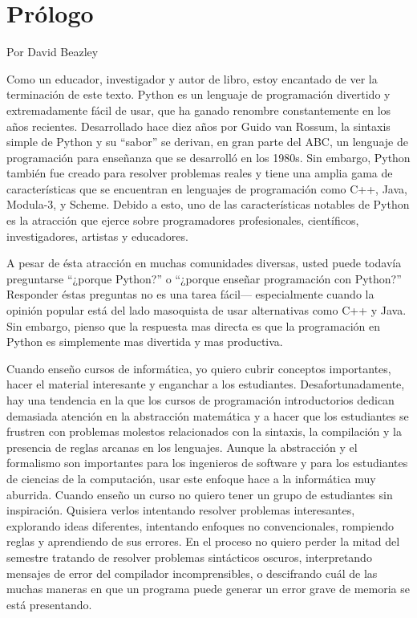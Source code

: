 
\chapter{Prólogo}

Por David Beazley

Como un educador, investigador y autor de libro, estoy encantado de ver
la terminación de este texto.  Python es un lenguaje de programación divertido y 
extremadamente fácil de usar, que ha ganado renombre constantemente en los años recientes.  
Desarrollado hace diez años por Guido
van Rossum, la sintaxis simple de Python y su ``sabor'' se derivan, en
gran parte del ABC, un lenguaje de programación para  enseñanza que se 
desarrolló en los 1980s.  Sin embargo, Python también fue creado para resolver problemas 
reales y tiene una amplia gama de características que se encuentran en lenguajes de
programación como C++, Java, Modula-3, y Scheme.  Debido a esto, uno de
las características notables de Python es  la  atracción que ejerce 
sobre programadores profesionales, científicos, investigadores, 
artistas y educadores.

A pesar de ésta atracción en  muchas  comunidades diversas, usted puede todavía preguntarse ``¿porque Python?'' o ``¿porque enseñar programación con Python?'' Responder 
éstas preguntas no es una tarea fácil---
especialmente cuando la opinión popular está del lado masoquista
de usar alternativas como C++ y Java.  Sin embargo, pienso que la respuesta mas directa es
que la programación en Python es simplemente mas divertida y mas productiva.

Cuando enseño cursos de informática, yo quiero cubrir conceptos
importantes, hacer el material interesante y enganchar a los estudiantes.
Desafortunadamente, hay una tendencia en la  que los cursos de programación
introductorios dedican demasiada atención en la abstracción
matemática y a hacer que los estudiantes se frustren con problemas
molestos relacionados con la sintaxis, la compilación  y la presencia
de reglas arcanas en los lenguajes. Aunque la abstracción y el formalismo
son importantes para los ingenieros de software y para los estudiantes de
ciencias de la computación, usar este enfoque hace a la informática muy aburrida.
Cuando enseño un curso no quiero tener un grupo de estudiantes sin inspiración.
Quisiera verlos intentando resolver problemas interesantes, explorando ideas diferentes, 
intentando enfoques no convencionales, rompiendo reglas y aprendiendo de sus errores. 
En el proceso no quiero perder la mitad del semestre tratando de resolver
problemas sintácticos oscuros, interpretando mensajes de error del compilador incomprensibles, 
o descifrando cuál de las muchas maneras en que un programa puede generar un 
error grave de memoria se está presentando.



